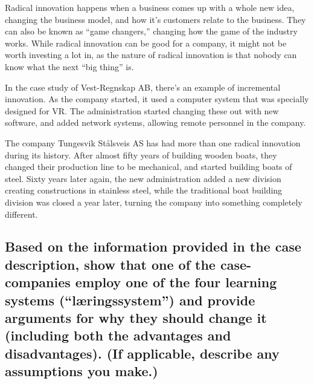 \documentclass[a4paper]{article}
\begin{document}
    Radical innovation happens when a business comes up with a whole new
    idea, changing the business model, and how it's customers relate to the
    business. They can also be known as ``game changers,'' changing how the
    game of the industry works. While radical innovation can be good for
    a company, it might not be worth investing a lot in, as the nature of
    radical innovation is that nobody can know what the next ``big thing'' is.

    In the case study of Vest-Regnskap AB, there's an example of incremental
    innovation. As the company started, it used a computer system that was
    specially designed for VR. The administration started changing these out
    with new software, and added network systems, allowing remote personnel in
    the company.

    The company Tungesvik Stålsveis AS has had more than one radical
    innovation during its history. After almost fifty years of building wooden
    boats, they changed their production line to be mechanical, and started
    building boats of steel. Sixty years later again, the new administration
    added a new division creating constructions in stainless steel, while the
    traditional boat building division was closed a year later, turning the
    company into something completely different.

    \subsection*{Based on the information provided in the case description,
    show that one of the case-companies employ one of the four learning
    systems (``læringssystem'') and provide arguments for why they should
    change it (including both the advantages and disadvantages). (If
    applicable, describe any assumptions you make.)}
\end{document}
